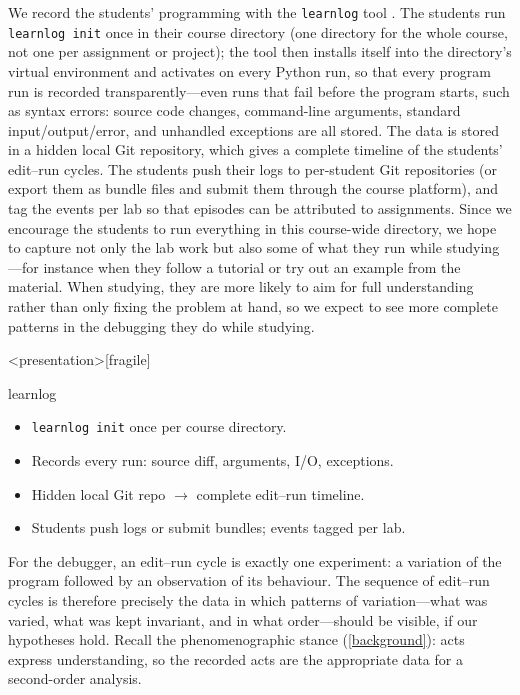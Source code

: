 We record the students' programming with the \texttt{learnlog} tool
\autocite{learnlog}.
The students run \texttt{learnlog init} once in their course directory (one
directory for the whole course, not one per assignment or project); the
tool then installs itself into the directory's virtual environment and
activates on every Python run, so that every program run is recorded
transparently---even runs that fail before the program starts, such as
syntax errors: source code changes, command-line arguments, standard
input/output/error, and unhandled exceptions are all stored.
The data is stored in a hidden local Git repository, which gives a complete
timeline of the students' edit--run cycles.
The students push their logs to per-student Git repositories (or export them
as bundle files and submit them through the course platform), and tag the
events per lab so that episodes can be attributed to assignments.
Since we encourage the students to run everything in this course-wide
directory, we hope to capture not only the lab work but also some of what
they run while studying---for instance when they follow a tutorial or try
out an example from the material.
When studying, they are more likely to aim for full understanding rather
than only fixing the problem at hand, so we expect to see more complete
patterns in the debugging they do while studying.

\begin{frame}<presentation>[fragile]
  \begin{block}{learnlog}
    \begin{itemize}
      \item \texttt{learnlog init} once per course directory.
      \item Records every run: source diff, arguments, I/O, exceptions.
      \item Hidden local Git repo \(\to\) complete edit--run timeline.
      \item Students push logs or submit bundles; events tagged per lab.
    \end{itemize}
  \end{block}
\end{frame}

For the debugger, an edit--run cycle is exactly one experiment: a variation of
the program followed by an observation of its behaviour.
The sequence of edit--run cycles is therefore precisely the data in which
patterns of variation---what was varied, what was kept invariant, and in
what order---should be visible, if our hypotheses hold.
Recall the phenomenographic stance
(\cref{background}): acts express understanding, so the recorded acts are the
appropriate data for a second-order analysis.

